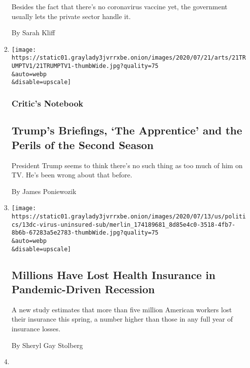\begin{enumerate}
  Besides the fact that there's no coronavirus vaccine yet, the
  government usually lets the private sector handle it.

  By Sarah Kliff
\item
  \href{/2020/07/21/arts/television/trump-briefings.html}{}

  \texttt{[image: https://static01.graylady3jvrrxbe.onion/images/2020/07/21/arts/21TRUMPTV1/21TRUMPTV1-thumbWide.jpg?quality=75\\\&auto=webp\\\&disable=upscale]}

  \hypertarget{critics-notebook}{%
  \subsubsection{Critic's Notebook}\label{critics-notebook}}

  \hypertarget{trumps-briefings-the-apprentice-and-the-perils-of-the-second-season}{%
  \subsection{Trump's Briefings, `The Apprentice' and the Perils of the
  Second
  Season}\label{trumps-briefings-the-apprentice-and-the-perils-of-the-second-season}}

  President Trump seems to think there's no such thing as too much of
  him on TV. He's been wrong about that before.

  By James Poniewozik
\item
  \href{/2020/07/13/us/politics/coronavirus-health-insurance-trump.html}{}

  \texttt{[image: https://static01.graylady3jvrrxbe.onion/images/2020/07/13/us/politics/13dc-virus-uninsured-sub/merlin\_174189681\_8d85e4c0-3518-4fb7-8b6b-67283a5e2783-thumbWide.jpg?quality=75\\\&auto=webp\\\&disable=upscale]}

  \hypertarget{millions-have-lost-health-insurance-in-pandemic-driven-recession}{%
  \subsection{Millions Have Lost Health Insurance in Pandemic-Driven
  Recession}\label{millions-have-lost-health-insurance-in-pandemic-driven-recession}}

  A new study estimates that more than five million American workers
  lost their insurance this spring, a number higher than those in any
  full year of insurance losses.

  By Sheryl Gay Stolberg
\item
  \href{/2020/07/05/nyregion/nj-migrant-workers-covid-19.html}{}


\end{enumerate}
